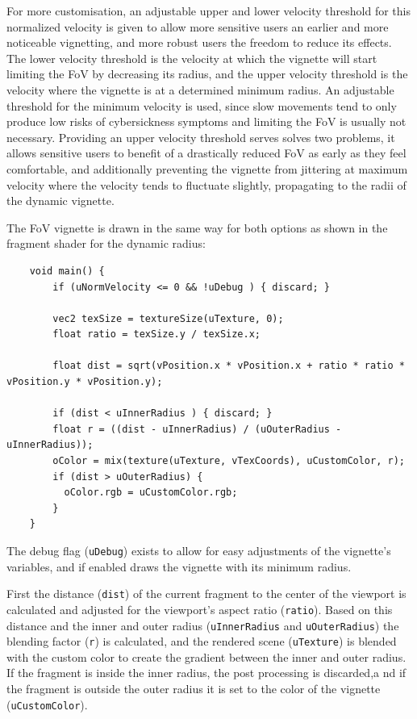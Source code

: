 For more customisation, an adjustable upper and lower velocity threshold for this normalized velocity is given to
allow more sensitive users an earlier and more noticeable vignetting, and more robust users the freedom to reduce its
effects.
The lower velocity threshold is the velocity at which the vignette will start limiting the FoV by decreasing its
radius, and the upper velocity threshold is the velocity where the vignette is at a determined minimum radius.
An adjustable threshold for the minimum velocity is used, since slow movements tend to only produce low risks of
cybersickness symptoms and limiting the FoV is usually not necessary.
Providing an upper velocity threshold serves solves two problems, it allows sensitive users to benefit of a
drastically reduced FoV as early as they feel comfortable, and additionally preventing the vignette from jittering
at maximum velocity where the velocity tends to fluctuate slightly, propagating to the radii of the dynamic vignette.

The FoV vignette is drawn in the same way for both options as shown in the fragment shader for the dynamic radius:
\begin{verbatim}
    void main() {
        if (uNormVelocity <= 0 && !uDebug ) { discard; }

        vec2 texSize = textureSize(uTexture, 0);
        float ratio = texSize.y / texSize.x;

        float dist = sqrt(vPosition.x * vPosition.x + ratio * ratio * vPosition.y * vPosition.y);

        if (dist < uInnerRadius ) { discard; }
        float r = ((dist - uInnerRadius) / (uOuterRadius - uInnerRadius));
        oColor = mix(texture(uTexture, vTexCoords), uCustomColor, r);
        if (dist > uOuterRadius) {
          oColor.rgb = uCustomColor.rgb;
        }
    }
\end{verbatim}
The debug flag (\texttt{uDebug}) exists to allow for easy adjustments of the vignette's variables, and if enabled
draws the vignette with its minimum radius.

First the distance (\texttt{dist}) of the current fragment to the center of the viewport is calculated and
adjusted for the viewport's aspect ratio (\texttt{ratio}).
Based on this distance and the inner and outer radius (\texttt{uInnerRadius} and \texttt{uOuterRadius})
the blending factor (\texttt{r}) is calculated, and the rendered scene (\texttt{uTexture}) is blended
with the custom color to create the gradient between the inner and outer radius.
If the fragment is inside the inner radius, the post processing is discarded,a nd if the fragment is outside the
outer radius it is set to the color of the vignette (\texttt{uCustomColor}).


